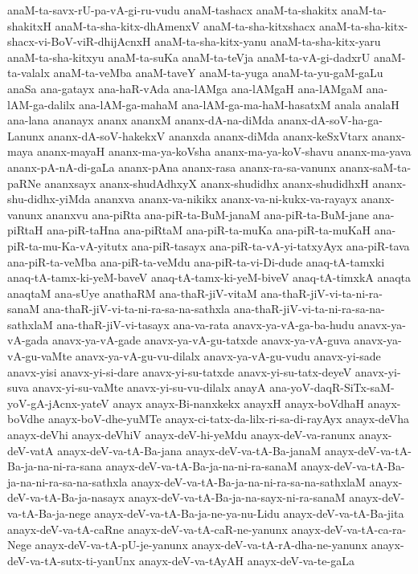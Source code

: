 {anaM-ta-savx-rU-pa-vA-gi-ru-vudu
anaM-tashacx
anaM-ta-shakitx
anaM-ta-shakitxH
anaM-ta-sha-kitx-dhAmenxV
anaM-ta-sha-kitxshacx
anaM-ta-sha-kitx-shacx-vi-BoV-viR-dhijAcnxH
anaM-ta-sha-kitx-yanu
anaM-ta-sha-kitx-yaru
anaM-ta-sha-kitxyu
anaM-ta-suKa
anaM-ta-teVja
anaM-ta-vA-gi-dadxrU
anaM-ta-valalx
anaM-ta-veMba
anaM-taveY
anaM-ta-yuga
anaM-ta-yu-gaM-gaLu
anaSa
ana-gatayx
ana-haR-vAda
ana-lAMga
ana-lAMgaH
ana-lAMgaM
ana-lAM-ga-dalilx
ana-lAM-ga-mahaM
ana-lAM-ga-ma-haM-hasatxM
anala
analaH
ana-lana
ananayx
ananx
ananxM
ananx-dA-na-diMda
ananx-dA-soV-ha-ga-Lanunx
ananx-dA-soV-hakekxV
ananxda
ananx-diMda
ananx-keSxVtarx
ananx-maya
ananx-mayaH
ananx-ma-ya-koVsha
ananx-ma-ya-koV-shavu
ananx-ma-yava
ananx-pA-nA-di-gaLa
ananx-pAna
ananx-rasa
ananx-ra-sa-vanunx
ananx-saM-ta-paRNe
ananxsayx
ananx-shudAdhxyX
ananx-shudidhx
ananx-shudidhxH
ananx-shu-didhx-yiMda
ananxva
ananx-va-nikikx
ananx-va-ni-kukx-va-rayayx
ananx-vanunx
ananxvu
ana-piRta
ana-piR-ta-BuM-janaM
ana-piR-ta-BuM-jane
ana-piRtaH
ana-piR-taHna
ana-piRtaM
ana-piR-ta-muKa
ana-piR-ta-muKaH
ana-piR-ta-mu-Ka-vA-yitutx
ana-piR-tasayx
ana-piR-ta-vA-yi-tatxyAyx
ana-piR-tava
ana-piR-ta-veMba
ana-piR-ta-veMdu
ana-piR-ta-vi-Di-dude
anaq-tA-tamxki
anaq-tA-tamx-ki-yeM-baveV
anaq-tA-tamx-ki-yeM-biveV
anaq-tA-timxkA
anaqta
anaqtaM
ana-sUye
anathaRM
ana-thaR-jiV-vitaM
ana-thaR-jiV-vi-ta-ni-ra-sanaM
ana-thaR-jiV-vi-ta-ni-ra-sa-na-sathxla
ana-thaR-jiV-vi-ta-ni-ra-sa-na-sathxlaM
ana-thaR-jiV-vi-tasayx
ana-va-rata
anavx-ya-vA-ga-ba-hudu
anavx-ya-vA-gada
anavx-ya-vA-gade
anavx-ya-vA-gu-tatxde
anavx-ya-vA-guva
anavx-ya-vA-gu-vaMte
anavx-ya-vA-gu-vu-dilalx
anavx-ya-vA-gu-vudu
anavx-yi-sade
anavx-yisi
anavx-yi-si-dare
anavx-yi-su-tatxde
anavx-yi-su-tatx-deyeV
anavx-yi-suva
anavx-yi-su-vaMte
anavx-yi-su-vu-dilalx
anayA
ana-yoV-daqR-SiTx-saM-yoV-gA-jAcnx-yateV
anayx
anayx-Bi-nanxkekx
anayxH
anayx-boVdhaH
anayx-boVdhe
anayx-boV-dhe-yuMTe
anayx-ci-tatx-da-lilx-ri-sa-di-rayAyx
anayx-deVha
anayx-deVhi
anayx-deVhiV
anayx-deV-hi-yeMdu
anayx-deV-va-ranunx
anayx-deV-vatA
anayx-deV-va-tA-Ba-jana
anayx-deV-va-tA-Ba-janaM
anayx-deV-va-tA-Ba-ja-na-ni-ra-sana
anayx-deV-va-tA-Ba-ja-na-ni-ra-sanaM
anayx-deV-va-tA-Ba-ja-na-ni-ra-sa-na-sathxla
anayx-deV-va-tA-Ba-ja-na-ni-ra-sa-na-sathxlaM
anayx-deV-va-tA-Ba-ja-nasayx
anayx-deV-va-tA-Ba-ja-na-sayx-ni-ra-sanaM
anayx-deV-va-tA-Ba-ja-nege
anayx-deV-va-tA-Ba-ja-ne-ya-nu-Lidu
anayx-deV-va-tA-Ba-jita
anayx-deV-va-tA-caRne
anayx-deV-va-tA-caR-ne-yanunx
anayx-deV-va-tA-ca-ra-Nege
anayx-deV-va-tA-pU-je-yanunx
anayx-deV-va-tA-rA-dha-ne-yanunx
anayx-deV-va-tA-sutx-ti-yanUnx
anayx-deV-va-tAyAH
anayx-deV-va-te-gaLa
}
